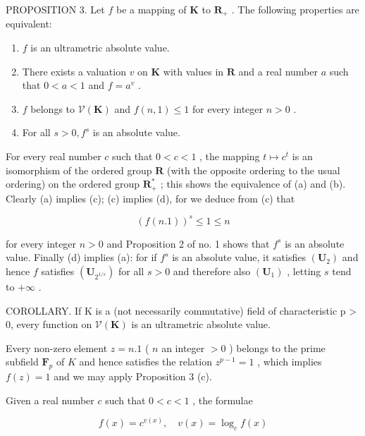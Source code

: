 PROPOSITION 3. Let \(f\) be a mapping of \(\mathbf{K}\) to \(\mathbf{R}_+\) . The following properties are equivalent:

\begin{enumerate}
\def\labelenumi{(\alph{enumi})}
\item
  \(f\) is an ultrametric absolute value.
\item
  There exists a valuation \(v\) on \(\mathbf{K}\) with values in \(\mathbf{R}\) and a real number \(a\) such that \(0 < a < 1\) and \(f = a^v\) .
\item
  \(f\) belongs to \(\mathcal{V}(\mathbf{K})\) and \(f(n,1) \leqslant 1\) for every integer \(n > 0\) .
\item
  For all \(s > 0, f^s\) is an absolute value.
\end{enumerate}

For every real number \(c\) such that \(0 < c < 1\) , the mapping \(t \mapsto c^t\) is an isomorphism of the ordered group \(\mathbf{R}\) (with the opposite ordering to the usual ordering) on the ordered group \(\mathbf{R}_+^*\) ; this shows the equivalence of (a) and (b). Clearly (a) implies (c); (c) implies (d), for we deduce from (c) that

\[
(f (n. 1)) ^ {s} \leqslant 1 \leqslant n
\]

for every integer \(n > 0\) and Proposition 2 of no. 1 shows that \(f^s\) is an absolute value. Finally (d) implies (a): for if \(f^s\) is an absolute value, it satisfies \((\mathbf{U}_2)\) and hence \(f\) satisfies \((\mathbf{U}_{2^{1 / s}})\) for all \(s > 0\) and therefore also \((\mathbf{U}_1)\) , letting \(s\) tend to \(+\infty\) .

COROLLARY. If K is a (not necessarily commutative) field of characteristic p > 0, every function on \(\mathcal{V}(\mathbf{K})\) is an ultrametric absolute value.

Every non-zero element \(z = n.1\) ( \(n\) an integer \(>0\) ) belongs to the prime subfield \(\mathbf{F}_p\) of \(K\) and hence satisfies the relation \(z^{p-1} = 1\) , which implies \(f(z) = 1\) and we may apply Proposition 3 (c).

Given a real number \(c\) such that \(0 < c < 1\) , the formulae

\[
f (x) = c ^ {v (x)}, \quad v (x) = \log_ {c} f (x)
\]

